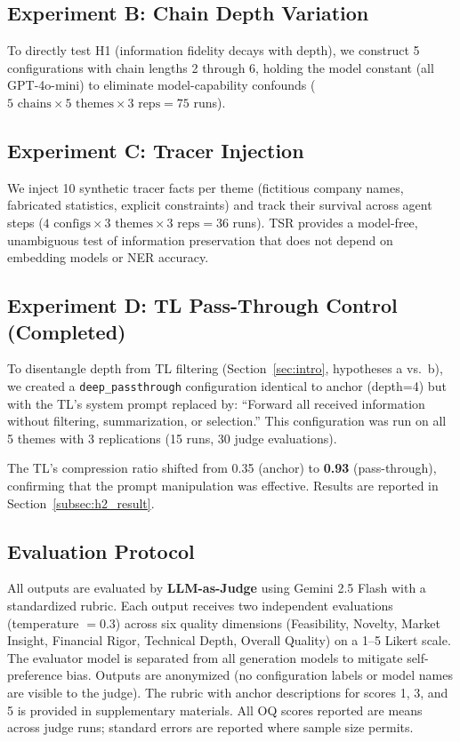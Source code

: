 \documentclass[conference]{IEEEtran}
\begin{document}
\subsection{Experiment B: Chain Depth Variation}

To directly test H1 (information fidelity decays with depth), we construct 5 configurations with chain lengths 2 through 6, holding the model constant (all GPT-4o-mini) to eliminate model-capability confounds ($5 \text{ chains} \times 5 \text{ themes} \times 3 \text{ reps} = 75$ runs).

\subsection{Experiment C: Tracer Injection}

We inject 10 synthetic tracer facts per theme (fictitious company names, fabricated statistics, explicit constraints) and track their survival across agent steps ($4 \text{ configs} \times 3 \text{ themes} \times 3 \text{ reps} = 36$ runs).
TSR provides a model-free, unambiguous test of information preservation that does not depend on embedding models or NER accuracy.

\subsection{Experiment D: TL Pass-Through Control (Completed)}
\label{subsec:exp_d}

To disentangle depth from TL filtering (Section~\ref{sec:intro}, hypotheses a vs.\ b), we created a \texttt{deep\_passthrough} configuration identical to anchor (depth=4) but with the TL's system prompt replaced by: ``Forward all received information without filtering, summarization, or selection.''
This configuration was run on all 5 themes with 3 replications (15 runs, 30 judge evaluations).

The TL's compression ratio shifted from 0.35 (anchor) to \textbf{0.93} (pass-through), confirming that the prompt manipulation was effective.
Results are reported in Section~\ref{subsec:h2_result}.

\subsection{Evaluation Protocol}

All outputs are evaluated by \textbf{LLM-as-Judge} using Gemini 2.5 Flash with a standardized rubric.
Each output receives two independent evaluations (temperature $= 0.3$) across six quality dimensions (Feasibility, Novelty, Market Insight, Financial Rigor, Technical Depth, Overall Quality) on a 1--5 Likert scale.
The evaluator model is separated from all generation models to mitigate self-preference bias.
Outputs are anonymized (no configuration labels or model names are visible to the judge).
The rubric with anchor descriptions for scores 1, 3, and 5 is provided in supplementary materials.
All OQ scores reported are means across judge runs; standard errors are reported where sample size permits.
\end{document}
